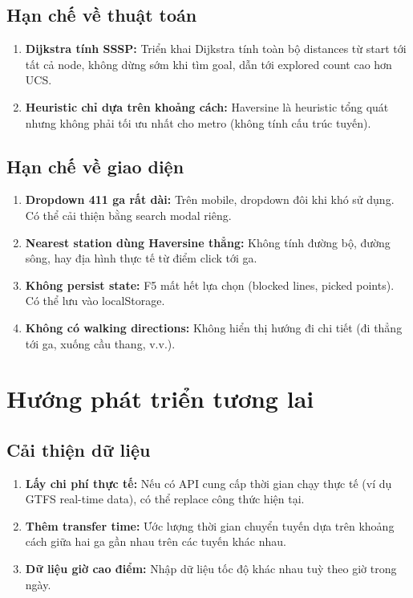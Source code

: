 \subsection{Hạn chế về thuật toán}

\begin{enumerate}
  \item \textbf{Dijkstra tính SSSP:} Triển khai Dijkstra tính toàn bộ distances từ start tới tất cả node, không dừng sớm khi tìm goal, dẫn tới explored count cao hơn UCS.

  \item \textbf{Heuristic chỉ dựa trên khoảng cách:} Haversine là heuristic tổng quát nhưng không phải tối ưu nhất cho metro (không tính cấu trúc tuyến).
\end{enumerate}

\subsection{Hạn chế về giao diện}

\begin{enumerate}
  \item \textbf{Dropdown 411 ga rất dài:} Trên mobile, dropdown đôi khi khó sử dụng. Có thể cải thiện bằng search modal riêng.

  \item \textbf{Nearest station dùng Haversine thẳng:} Không tính đường bộ, đường sông, hay địa hình thực tế từ điểm click tới ga.

  \item \textbf{Không persist state:} F5 mất hết lựa chọn (blocked lines, picked points). Có thể lưu vào localStorage.

  \item \textbf{Không có walking directions:} Không hiển thị hướng đi chi tiết (đi thẳng tới ga, xuống cầu thang, v.v.).
\end{enumerate}

\section{Hướng phát triển tương lai}

\subsection{Cải thiện dữ liệu}

\begin{enumerate}
  \item \textbf{Lấy chi phí thực tế:} Nếu có API cung cấp thời gian chạy thực tế (ví dụ GTFS real-time data), có thể replace công thức hiện tại.

  \item \textbf{Thêm transfer time:} Ước lượng thời gian chuyển tuyến dựa trên khoảng cách giữa hai ga gần nhau trên các tuyến khác nhau.

  \item \textbf{Dữ liệu giờ cao điểm:} Nhập dữ liệu tốc độ khác nhau tuỳ theo giờ trong ngày.
\end{enumerate}

